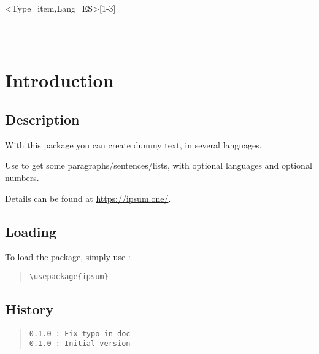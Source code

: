 \documentclass[11pt,a4paper]{ltxdoc}
\begin{document}
\begin{tcolorbox}[colframe=lightgray,colback=lightgray!5]
\ipsum<Type=item,Lang=ES>[1-3]
\end{tcolorbox}

\vfill~

\pagebreak


\hypertarget{matoc}{}

\tableofcontents

\vspace*{5mm}

\hrule

\vspace*{5mm}

\section{Introduction}

\subsection{Description}

With this package you can create dummy text, in several languages.

Use \cmd{\ipsum} to get some paragraphs/sentences/lists, with optional languages and optional numbers.

Details can be found at \url{https://ipsum.one/}.

\subsection{Loading}

To load the package, simply use :

\begin{quote}
\begin{verbatim}
\usepackage{ipsum}
\end{verbatim}
\end{quote}

\vfill

\subsection{History}

\begin{quote}
\begin{verbatim}
0.1.0 : Fix typo in doc
0.1.0 : Initial version
\end{verbatim}
\end{quote}
\end{document}
